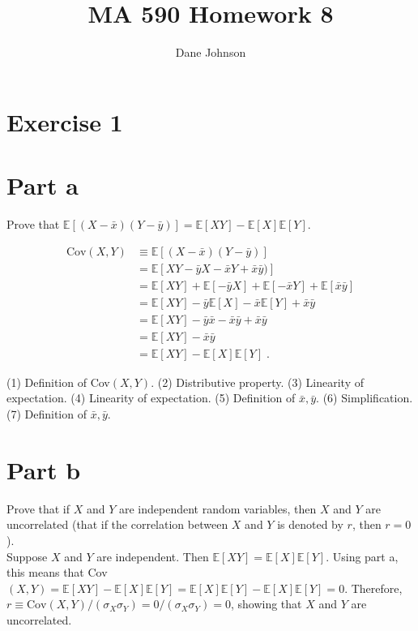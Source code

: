 \documentclass[11pt]{article}
\title{MA 590 Homework 8}
\author{Dane Johnson}
\begin{document}
\maketitle

\section*{Exercise 1}

\section*{Part a}

Prove that $\mathbb{E}[(X-\bar{x})(Y-\bar{y})] = \mathbb{E}[XY] - \mathbb{E}[X]\mathbb{E}[Y]$.

\begin{align}
\text{Cov}(X,Y) &\equiv \mathbb{E}[(X-\bar{x})(Y-\bar{y})] \\
&= \mathbb{E}[XY-\bar{y}X - \bar{x}Y + \bar{x}\bar{y})] \\
&=\mathbb{E}[XY] + \mathbb{E}[-\bar{y}X] + \mathbb{E}[-\bar{x}Y] + \mathbb{E}[\bar{x}\bar{y}] \\
&= \mathbb{E}[XY] - \bar{y}\mathbb{E}[X] - \bar{x}\mathbb{E}[Y] + \bar{x}\bar{y} \\
&= \mathbb{E}[XY] - \bar{y}\bar{x} - \bar{x}\bar{y} + \bar{x}\bar{y} \\
&= \mathbb{E}[XY] - \bar{x}\bar{y} \\
&= \mathbb{E}[XY] - \mathbb{E}[X]\mathbb{E}[Y] \;.
\end{align}

(1) Definition of Cov$(X,Y)$. (2) Distributive property. (3) Linearity of expectation. (4) Linearity of expectation. (5) Definition of $\bar{x},\bar{y}$. (6) Simplification. (7) Definition of $\bar{x},\bar{y}$.

\section*{Part b}

Prove that if $X$ and $Y$ are independent random variables, then $X$ and $Y$ are uncorrelated (that if the correlation between $X$ and $Y$ is denoted by $r$, then $r = 0$). \\

Suppose $X$ and $Y$ are independent. Then $\mathbb{E}[XY] = \mathbb{E}[X]\mathbb{E}[Y]$. Using part a, this means that Cov$(X,Y) = \mathbb{E}[XY] - \mathbb{E}[X]\mathbb{E}[Y] = \mathbb{E}[X]\mathbb{E}[Y] - \mathbb{E}[X]\mathbb{E}[Y] = 0$. Therefore, $r \equiv \text{Cov}(X,Y) / (\sigma_X \sigma_Y) = 0 / (\sigma_X \sigma_Y) = 0$, showing that $X$ and $Y$ are uncorrelated. 
\end{document}
